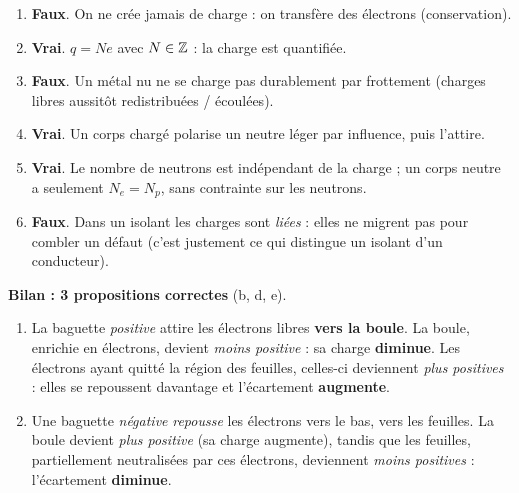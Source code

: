 \documentclass[11pt,a4paper]{article}
\begin{document}

\begin{corrige}
\begin{enumerate}[label=\alph*)]
  \item \textbf{Faux}. On ne crée jamais de charge : on transfère des électrons (conservation).
  \item \textbf{Vrai}. $q = N e$ avec $N\in\mathbb{Z}$ : la charge est quantifiée.
  \item \textbf{Faux}. Un métal nu ne se charge pas durablement par frottement (charges libres
        aussitôt redistribuées / écoulées).
  \item \textbf{Vrai}. Un corps chargé polarise un neutre léger par influence, puis l'attire.
  \item \textbf{Vrai}. Le nombre de neutrons est indépendant de la charge ; un corps neutre a
        seulement $N_e = N_p$, sans contrainte sur les neutrons.
  \item \textbf{Faux}. Dans un isolant les charges sont \emph{liées} : elles ne migrent pas pour
        combler un défaut (c'est justement ce qui distingue un isolant d'un conducteur).
\end{enumerate}
\textbf{Bilan : 3 propositions correctes} (b, d, e).
\end{corrige}

\begin{corrige}
\begin{enumerate}[label=\alph*)]
  \item La baguette \emph{positive} attire les électrons libres \textbf{vers la boule}. La boule,
        enrichie en électrons, devient \emph{moins positive} : sa charge \textbf{diminue}. Les
        électrons ayant quitté la région des feuilles, celles-ci deviennent \emph{plus positives} :
        elles se repoussent davantage et l'écartement \textbf{augmente}.
  \item Une baguette \emph{négative} \emph{repousse} les électrons vers le bas, vers les feuilles.
        La boule devient \emph{plus positive} (sa charge augmente), tandis que les feuilles,
        partiellement neutralisées par ces électrons, deviennent \emph{moins positives} :
        l'écartement \textbf{diminue}.
\end{enumerate}
\end{corrige}
\end{document}
